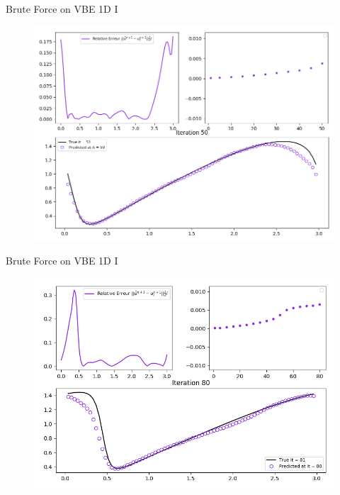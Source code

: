 \documentclass[10pt,
			   xcolor=svgnames,
			   hyperref={linkcolor=red, citecolor = DarkGreen, colorlinks=true, urlcolor=Navy}]{beamer}
\begin{document}
\begin{frame}{Brute Force on VBE 1D I}
	\begin{figure}[H]
	\centering
	\includegraphics[scale=0.35]{Pres_50th_Iteration_1.png}
	\end{figure} 
\end{frame}

\begin{frame}{Brute Force on VBE 1D I}
	\begin{figure}[H]
	\centering
	\includegraphics[scale=0.42]{Pres_Last_Iteration_1.png}
	\end{figure} 
\end{frame}
\end{document}
